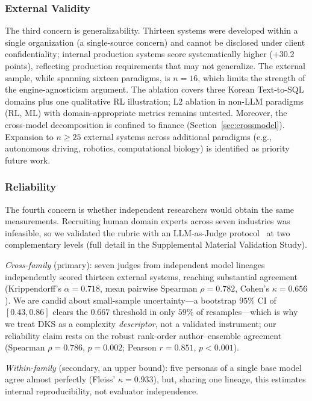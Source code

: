 \documentclass[fleqn,10pt,lineno]{wlpeerj}
\begin{document}
\subsubsection{External Validity}

The third concern is generalizability. Thirteen systems were developed within a single organization (a single-source concern) and cannot be disclosed under client confidentiality; internal production systems score systematically higher ($+30.2$ points), reflecting production requirements that may not generalize. The external sample, while spanning sixteen paradigms, is $n = 16$, which limits the strength of the engine-agnosticism argument. The ablation covers three Korean Text-to-SQL domains plus one qualitative RL illustration; L2 ablation in non-LLM paradigms (RL, ML) with domain-appropriate metrics remains untested. Moreover, the cross-model decomposition is confined to finance (Section~\ref{sec:crossmodel}). Expansion to $n \geq 25$ external systems across additional paradigms (e.g., autonomous driving, robotics, computational biology) is identified as priority future work.

\subsubsection{Reliability}

The fourth concern is whether independent researchers would obtain the same measurements. Recruiting human domain experts across seven industries was infeasible, so we validated the rubric with an LLM-as-Judge protocol~\citep{zheng2023llmjudge} at two complementary levels (full detail in the Supplemental Material Validation Study).

\textit{Cross-family} (primary): seven judges from independent model lineages independently scored thirteen external systems, reaching substantial agreement (Krippendorff's $\alpha = 0.718$, mean pairwise Spearman $\rho = 0.782$, Cohen's $\kappa = 0.656$). We are candid about small-sample uncertainty---a bootstrap $95\%$ CI of $[0.43, 0.86]$ clears the $0.667$ threshold in only $59\%$ of resamples---which is why we treat DKS as a complexity \textit{descriptor}, not a validated instrument; our reliability claim rests on the robust rank-order author--ensemble agreement (Spearman $\rho = 0.786$, $p = 0.002$; Pearson $r = 0.851$, $p < 0.001$).

\textit{Within-family} (secondary, an upper bound): five personas of a single base model agree almost perfectly (Fleiss' $\kappa = 0.933$), but, sharing one lineage, this estimates internal reproducibility, not evaluator independence.
\end{document}
